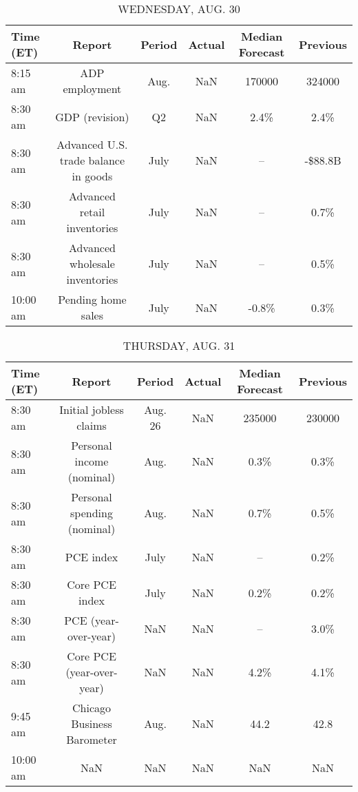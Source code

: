 \documentclass{article}%
\begin{document}
\begin{table}[htbp]%
\caption{WEDNESDAY, AUG. 30}%
\centering%
\begin{adjustbox}{width=1\textwidth}%
\begin{tabular}{lccccc}
\toprule
Time (ET) &                               Report & Period & Actual & Median Forecast & Previous \\
\midrule
  8:15 am &                       ADP employment &   Aug. &    NaN &          170000 &   324000 \\
  8:30 am &                       GDP (revision) &     Q2 &    NaN &            2.4\% &     2.4\% \\
  8:30 am & Advanced U.S. trade balance in goods &   July &    NaN &              -- &  -\$88.8B \\
  8:30 am &          Advanced retail inventories &   July &    NaN &              -- &     0.7\% \\
  8:30 am &       Advanced wholesale inventories &   July &    NaN &              -- &     0.5\% \\
 10:00 am &                   Pending home sales &   July &    NaN &           -0.8\% &     0.3\% \\
\bottomrule
\end{tabular}
%
\end{adjustbox}%
\end{table}

%


\begin{table}[htbp]%
\caption{THURSDAY, AUG. 31}%
\centering%
\begin{adjustbox}{width=1\textwidth}%
\begin{tabular}{lccccc}
\toprule
Time (ET) &                      Report &  Period & Actual & Median Forecast & Previous \\
\midrule
  8:30 am &      Initial jobless claims & Aug. 26 &    NaN &          235000 &   230000 \\
  8:30 am &   Personal income (nominal) &    Aug. &    NaN &            0.3\% &     0.3\% \\
  8:30 am & Personal spending (nominal) &    Aug. &    NaN &            0.7\% &     0.5\% \\
  8:30 am &                   PCE index &    July &    NaN &              -- &     0.2\% \\
  8:30 am &              Core PCE index &    July &    NaN &            0.2\% &     0.2\% \\
  8:30 am &        PCE (year-over-year) &     NaN &    NaN &              -- &     3.0\% \\
  8:30 am &   Core PCE (year-over-year) &     NaN &    NaN &            4.2\% &     4.1\% \\
  9:45 am &  Chicago Business Barometer &    Aug. &    NaN &            44.2 &     42.8 \\
 10:00 am &                         NaN &     NaN &    NaN &             NaN &      NaN \\
\bottomrule
\end{tabular}
%
\end{adjustbox}%
\end{table}
\end{document}
